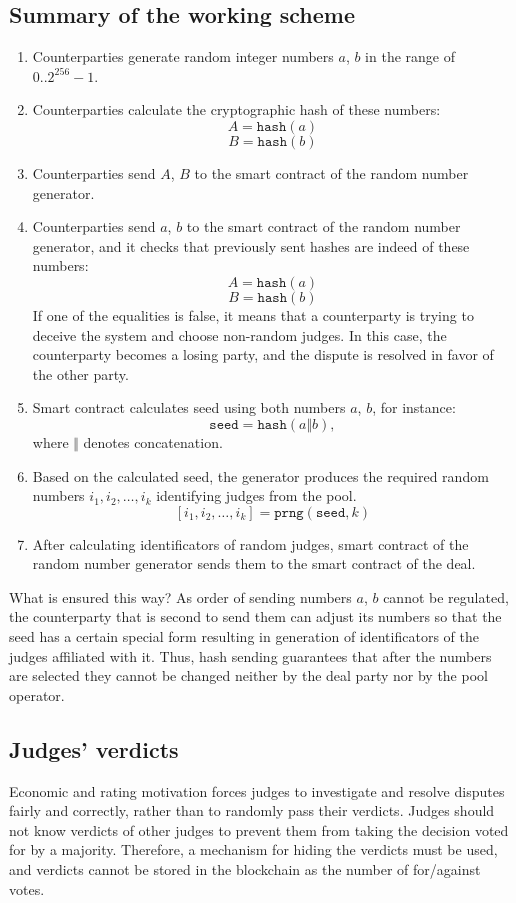 \documentclass[12pt]{article}
\begin{document}
\subsection{Summary of the working scheme}
\begin{enumerate}
		\item Counterparties generate random integer numbers $a$, $b$ in the range of $0..2^{256}-1$.
		\item Counterparties calculate the cryptographic hash of these numbers:  
		\[A=\texttt{hash}(a)\]
		\[B=\texttt{hash}(b)\]
		\item Counterparties send $A$, $B$ to the smart contract of the random number generator.
		\item Counterparties send $a$, $b$ to the smart contract of the random number generator, and it checks that previously sent hashes are indeed of these numbers:
				\[A =\texttt{hash}(a)\]
				\[B =\texttt{hash}(b)\]
				If one of the equalities is false, it means that a counterparty
				is trying to deceive the system and choose non-random judges.
				In this case, the counterparty becomes a losing party, and the
				dispute is resolved in favor of the other party. 

		\item Smart contract calculates seed using both numbers $a$, $b$, for instance:
				\[\texttt{seed} = \texttt{hash}(a\Vert b),\] where $\Vert$ denotes concatenation.
		\item Based on the calculated seed, the generator produces the required random numbers $i_1, i_2, \dots , i_k$ identifying judges from the pool.
				\[[i_1, i_2, \dots , i_k ] =\texttt{prng}(\texttt{seed}, k)\]
		\item After calculating identificators of random judges, smart contract of the random number generator sends them to the smart contract of the deal.
\end{enumerate}
What is ensured this way? As order of sending numbers $a$, $b$ cannot be regulated, the counterparty that is second to
send them can adjust its numbers so that the seed has a certain special form resulting in generation of identificators
of the judges affiliated with it. Thus, hash sending guarantees that after the numbers are selected they cannot be
changed neither by the deal party nor by the pool operator.

\subsection{Judges’ verdicts}
Economic and rating motivation forces judges to investigate and resolve disputes fairly and correctly, rather than to randomly pass their
verdicts. Judges should not know verdicts of other judges to prevent them from taking the decision voted for by a majority. Therefore, a
mechanism for hiding the verdicts must be used, and verdicts cannot be stored in the blockchain as the number of for/against votes.
\end{document}
